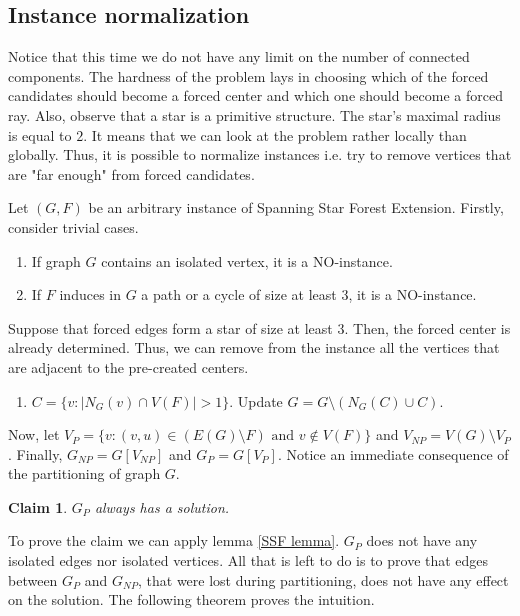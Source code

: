 \documentclass[en]{pracamgr}
\newtheorem{claim}{Claim}
\newcommand{\ssfep}{{\sc Spanning Star Forest Extension}}
\begin{document}
\subsection{Instance normalization} 

Notice that this time we do not have any limit on the number of connected components. The hardness of the problem lays in choosing which of the forced candidates should become a forced center and which one should become a forced ray. Also, observe that a star is a primitive structure. The star's maximal radius is equal to $2$. It means that we can look at the problem rather locally than globally. Thus, it is possible to normalize instances i.e. try to remove vertices that are "far enough" from forced candidates.

Let $(G, F)$ be an arbitrary instance of \ssfep{}. Firstly, consider trivial cases.

\begin{enumerate}[leftmargin=*,label=\textbf{Reduction \arabic{enumi}}]
	\item If graph $G$ contains an isolated vertex, it is a NO-instance.
	\item If $F$ induces in $G$ a path or a cycle of size at least $3$, it is a NO-instance.
\end{enumerate}

Suppose that forced edges form a star of size at least $3$. Then, the forced center is already determined. Thus, we can remove from the instance all the vertices that are adjacent to the pre-created centers.
\begin{enumerate}[leftmargin=*,label=\textbf{Reduction \arabic{enumi}},resume]
	\item $C = \{v: |N_G(v) \cap V(F)| > 1\}$. Update $G= G \setminus (N_G(C) \cup C)$.
\end{enumerate}

Now, let $V_P = \{v: (v,u) \in (E(G) \setminus F) \text{ and } v \notin V(F)\}$ and $V_{NP} = V(G) \setminus V_P$. Finally, $G_{NP} = G[V_{NP}]$ and $G_P = G[V_P]$. Notice an immediate consequence of the partitioning of graph $G$.

\begin{claim}\label{gp cut}
	$G_P$ always has a solution.
\end{claim}

To prove the claim we can apply lemma \ref{SSF lemma}. $G_P$ does not have any isolated edges nor isolated vertices. All that is left to do is to prove that edges between $G_P$ and $G_{NP}$, that were lost during partitioning, does not have any effect on the solution. The following theorem proves the intuition.
\end{document}
